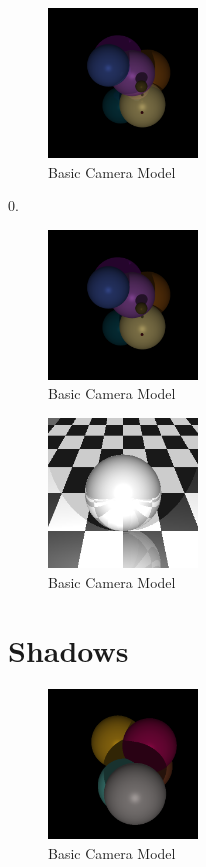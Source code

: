 \documentclass{article}
\begin{document}
\begin{figure}[H]
  \begin{center}
  \includegraphics[width=150px]{Images/reflectionsOn.png}
  \caption{Basic Camera Model}
  \label{fig:basiccammod}
  \end{center}
\end{figure}
0.
\begin{figure}[H]
  \begin{center}
  \includegraphics[width=150px]{Images/reflectionsOff.png}
  \caption{Basic Camera Model}
  \label{fig:basiccammod}
  \end{center}
\end{figure}

\begin{figure}[H]
  \begin{center}
  \includegraphics[width=150px]{Images/gridSphere.png}
  \caption{Basic Camera Model}
  \label{fig:basiccammod}
  \end{center}
\end{figure}

\section{Shadows}

\begin{figure}[H]
  \begin{center}
  \includegraphics[width=150px]{Images/shadows.png}
  \caption{Basic Camera Model}
  \label{fig:basiccammod}
  \end{center}
\end{figure}
\end{document}
